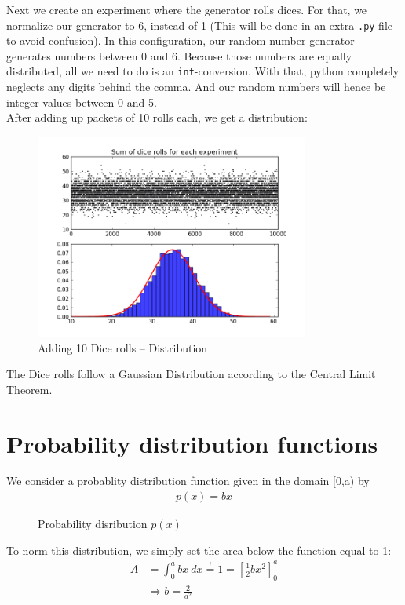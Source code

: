 \documentclass{article}
\begin{document}
Next we create an experiment where the generator rolls dices. For that, we
normalize our generator to 6, instead of 1 (This will be done in an extra
\texttt{.py} file to avoid confusion). In this configuration, our random number
generator generates numbers between 0 and 6. Because those numbers are equally
distributed, all we need to do is an \texttt{int}-conversion. With that,
python completely neglects any digits behind the comma. And our random numbers
will hence be integer values between 0 and 5. \\
After adding up packets of 10 rolls each, we get a distribution:
\begin{figure}[H]
    \centering
    \includegraphics[width=9cm]{Fig1-5.png}
    \caption{Adding 10 Dice rolls -- Distribution}
\end{figure}
The Dice rolls follow a Gaussian Distribution according to the Central Limit
Theorem.

\section{Probability distribution functions}

We consider a probablity distribution function given in the domain [0,a) by
\begin{align}
    p(x) = bx
\end{align}

\begin{figure}[H]
    \centering
    \caption{Probability disribution $p(x)$}
\end{figure}

To norm this distribution, we simply set the area below the function equal to 1:
\begin{align} \nonumber
    A &= \int _0^a bx \ dx \stackrel{!}{=} 1
    = \left[ \frac{1}{2} b x^2 \right]_0^a \\
    &\Rightarrow b = \frac{2}{a^2}
\end{align}
\end{document}
